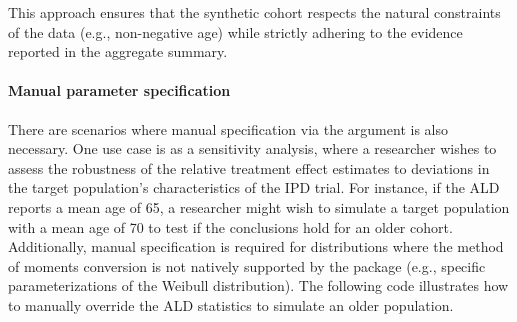 \documentclass[article]{jss}
\begin{document}
This approach ensures that the synthetic cohort respects the natural constraints of the data (e.g., non-negative age) while strictly adhering to the evidence reported in the aggregate summary.

\paragraph{Manual parameter specification}
There are scenarios where manual specification via the  argument is also necessary. 
One use case is as a sensitivity analysis, where a researcher wishes to assess the robustness of the relative treatment effect estimates to deviations in the target population's characteristics of the IPD trial. For instance, if the ALD reports a mean age of 65, a researcher might wish to simulate a target population with a mean age of 70 to test if the conclusions hold for an older cohort. Additionally, manual specification is required for distributions where the method of moments conversion is not natively supported by the package (e.g., specific parameterizations of the Weibull distribution).
The following code illustrates how to manually override the ALD statistics to simulate an older population.
\end{document}
